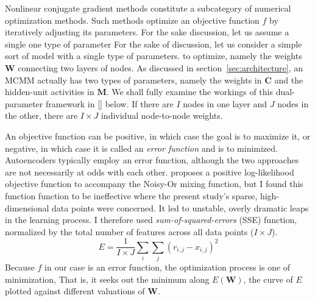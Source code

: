 Nonlinear conjugate gradient methods constitute a subcategory 
of numerical optimization methods. Such methods optimize
an objective function $f$ by iteratively adjusting its parameters.
For the sake discussion, let us assume a single one type of parameter
For the sake of discussion, let us consider a simple sort of model with a single type of parameters.
to optimize, namely the weights $\textbf{W}$ connecting two layers of nodes. 
As discussed in section~\ref{sec:architecture},
an MCMM actually has two types of parameters, namely
the weights in $\textbf{C}$ and the hidden-unit activities in $\textbf{M}$. 
We shall fully examine the workings of this dual-parameter framework in \ref{} below.
If there are $I$ nodes in one layer and $J$ nodes in the other, there are $I \times J$ 
individual node-to-node weights.

An objective function can be positive, in which case the goal is to maximize it, or negative, 
in which case it is
called an \emph{error function} and is to minimized. Autoencoders typically 
employ an error function, although the two approaches are not necessarily at odds 
with each other. \citet{saund:94} proposes a positive log-likelihood objective function 
to accompany the Noisy-Or mixing function, but I found this function function to be 
ineffective where the present study's sparse, high-dimensional data points were concerned. 
It led to unstable, overly dramatic leaps in the learning process. 
I therefore used \emph{sum-of-squared-errors} (SSE)  function, normalized by the total number of features across
all data points ($I \times J$).
\begin{equation} \label{eq:sse}
E = \frac{1}{I \times J} \sum_{i} \sum_{j} {(r_{i,j} - x_{i,j})}^2
\end{equation}
Because $f$ in our case is an error function, the optimization process is one of minimization, 
That is, it seeks out the minimum along $E(\mathbf{W})$, the curve of $E$ 
plotted against different valuations of $\mathbf{W}$.


